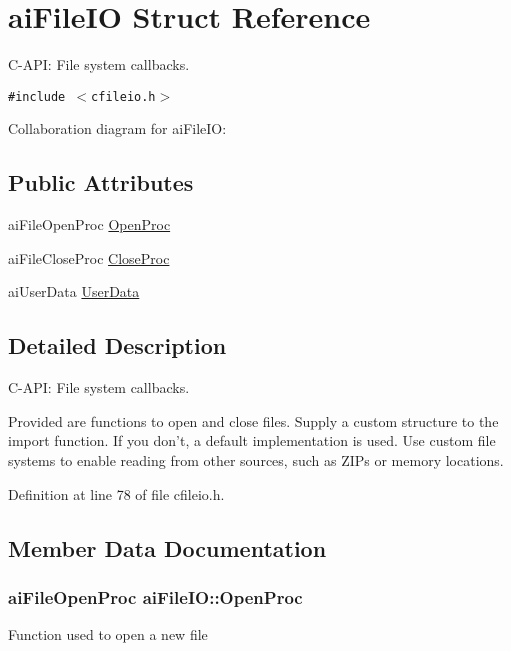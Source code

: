 \hypertarget{structai_file_i_o}{
\section{aiFileIO Struct Reference}
\label{structai_file_i_o}
}
C-API: File system callbacks.  


{\tt \#include $<$cfileio.h$>$}

Collaboration diagram for aiFileIO:\subsection*{Public Attributes}
\begin{CompactItemize}
\item 
aiFileOpenProc \hyperlink{structai_file_i_o_819d9c7823039294125068d06949a6df}{OpenProc}
\item 
aiFileCloseProc \hyperlink{structai_file_i_o_7ec702672712b5a02dc49cb17f980a14}{CloseProc}
\item 
aiUserData \hyperlink{structai_file_i_o_9c62b7f3d70fbb2f41e33ad0b9933139}{UserData}
\end{CompactItemize}


\subsection{Detailed Description}
C-API: File system callbacks. 

Provided are functions to open and close files. Supply a custom structure to the import function. If you don't, a default implementation is used. Use custom file systems to enable reading from other sources, such as ZIPs or memory locations. 

Definition at line 78 of file cfileio.h.

\subsection{Member Data Documentation}
\hypertarget{structai_file_i_o_819d9c7823039294125068d06949a6df}{
\subsubsection[OpenProc]{\setlength{\rightskip}{0pt plus 5cm}aiFileOpenProc {\bf aiFileIO::OpenProc}}}
\label{structai_file_i_o_819d9c7823039294125068d06949a6df}


Function used to open a new file 

